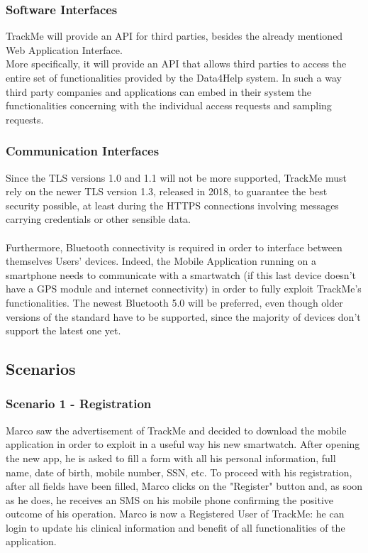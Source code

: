 \documentclass[12pt,a4paper]{article}
\begin{document}
	\subsubsection{Software Interfaces}
		TrackMe will provide an API for third parties, besides the already mentioned Web Application Interface.\\
		More specifically, it will provide an API that allows third parties to access the entire set of functionalities provided by the Data4Help system. In such a way third party companies and applications can embed in their system the functionalities concerning with the individual access requests and sampling requests. 
		
	\subsubsection{Communication Interfaces}
			Since the TLS versions 1.0 and 1.1 will not be more supported, TrackMe must rely on the newer TLS version 1.3, released in 2018, to guarantee the best security possible, at least during the HTTPS connections involving messages carrying credentials or other sensible data.
			\\ \\
			Furthermore, Bluetooth connectivity is required in order to interface between themselves Users' devices. Indeed, the Mobile Application running on a smartphone needs to communicate with a smartwatch (if this last device doesn't have a GPS module and internet connectivity) in order to fully exploit TrackMe's functionalities. The newest Bluetooth 5.0 will be preferred, even though older versions of the standard have to be supported, since the majority of devices don't support the latest one yet.

	\newpage
	\subsection{Scenarios}
	\subsubsection*{Scenario 1 - Registration}
		Marco saw the advertisement of TrackMe and decided to download the mobile application in order to exploit in a useful way his new smartwatch. After opening the new app, he is asked to fill a form with all his personal information, full name, date of birth, mobile number, SSN, etc. To proceed with his registration, after all fields have been filled, Marco clicks on the "Register" button and, as soon as he does, he receives an SMS on his mobile phone confirming the positive outcome of his operation. Marco is now a Registered User of TrackMe: he can login to update his clinical information and benefit of all functionalities of the application.
\end{document}
